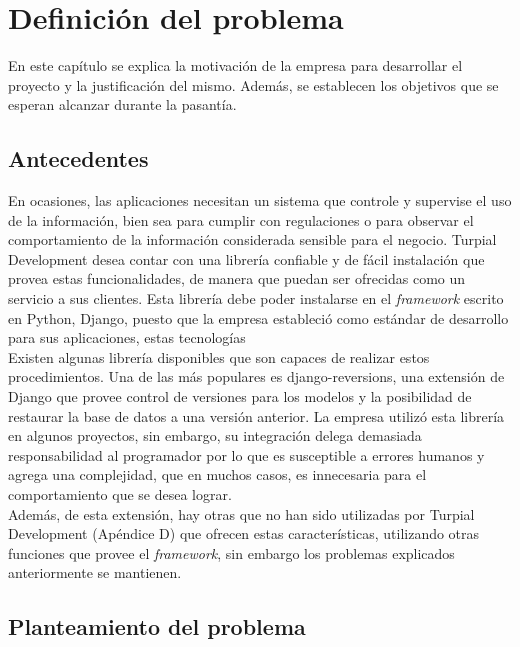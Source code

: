 \chapter{\textbf{Definición del problema}}

\thispagestyle{empty}

En este capítulo se explica la motivación de la empresa para desarrollar el
proyecto y la justificación del mismo. Además, se establecen los objetivos que
se esperan alcanzar durante la pasantía.

\section{Antecedentes}

En ocasiones, las aplicaciones necesitan un sistema que controle y supervise el uso de la información, bien sea para cumplir con regulaciones o para observar el comportamiento de la información considerada sensible para el negocio. Turpial Development desea contar con una librería confiable y de fácil instalación que provea estas funcionalidades, de manera que puedan ser ofrecidas como un servicio a sus clientes. Esta librería debe poder instalarse en el \textit{framework} escrito en Python, Django, puesto que la empresa estableció como estándar de desarrollo para sus aplicaciones, estas tecnologías \\

Existen algunas librería disponibles que son capaces de realizar estos
procedimientos. Una de las más populares es django-reversions, una extensión de
Django que provee control de versiones para los modelos y la posibilidad de
restaurar la base de datos a una versión anterior. La empresa utilizó esta
librería en algunos proyectos, sin embargo, su integración delega demasiada
responsabilidad al programador por lo que es susceptible a errores humanos y
agrega una complejidad, que en muchos casos, es innecesaria para el
comportamiento que se desea lograr. \\

Además, de esta extensión, hay otras que no han sido utilizadas por Turpial
Development (Apéndice D) que ofrecen estas características, utilizando otras
funciones que provee el \textit{framework}, sin embargo los problemas explicados
anteriormente se mantienen.

\section{Planteamiento del problema}

